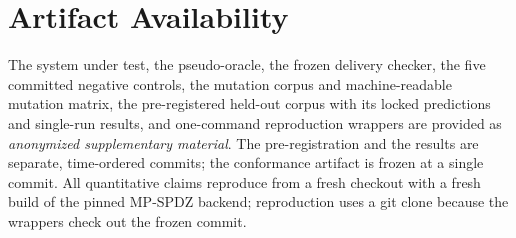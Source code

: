\documentclass[conference]{IEEEtran}
\begin{document}
\section*{Artifact Availability}
The system under test, the pseudo-oracle, the frozen delivery checker, the five committed
negative controls, the mutation corpus and machine-readable mutation matrix, the
pre-registered held-out corpus with its locked predictions and single-run results, and
one-command reproduction wrappers are provided as \emph{anonymized supplementary material}.
The pre-registration and the results are separate, time-ordered commits; the conformance
artifact is frozen at a single commit. All quantitative claims reproduce from a fresh checkout
with a fresh build of the pinned MP-SPDZ backend; reproduction uses a git clone because the
wrappers check out the frozen commit.
\end{document}
